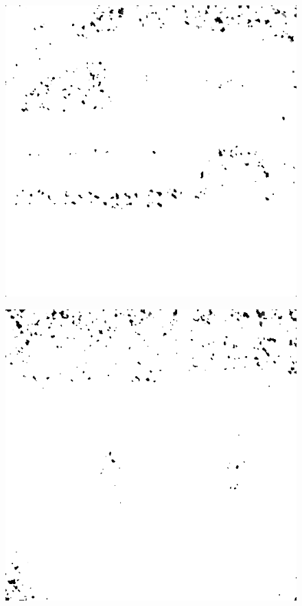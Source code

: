 \begin{figure}[H]
\ContinuedFloat
\begin{minipage}[t]{0.3\linewidth} %
	\includegraphics[width = 1\linewidth]{gfx/car/car_m15.png}
	\label{fig:car_m15}
\end{minipage}
\begin{minipage}[t]{0.3\linewidth} %
	\includegraphics[width = 1\linewidth]{gfx/hus/hus_m15.png}

\end{minipage}
\end{figure}
